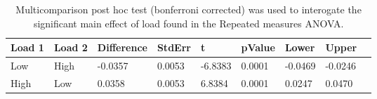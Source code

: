 \begin{table}
\centering
\begin{tabular}[0.2em]{@{}lllllllll@{}}\toprule
Load 1 & Load 2 & Difference & StdErr & t & pValue & Lower & Upper\\\toprule[0.2em]
Low & High & -0.0357 & 0.0053 & -6.8383 & 0.0001 & -0.0469 & -0.0246 \\\midrule
High & Low & 0.0358 & 0.0053 & 6.8384 & 0.0001 & 0.0247 & 0.0470 \\\bottomrule[0.2em]
\end{tabular}
\caption{Multicomparison post hoc test (bonferroni corrected) was used to interogate the significant main effect of load found in the Repeated measures ANOVA.\label{tabel:tbl_RMAEFC2_PH_load}}
\end{table}
